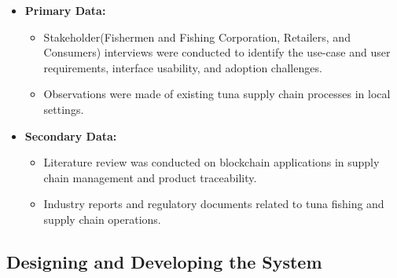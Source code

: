 \begin{itemize}
	\item \textbf{Primary Data:} 
	\begin{itemize}
		\item Stakeholder(Fishermen and Fishing Corporation, Retailers, and Consumers) interviews were conducted to identify the use-case and user requirements, interface usability, and adoption challenges.
		\item Observations were made of existing tuna supply chain processes in local settings.
	\end{itemize}
	\item \textbf{Secondary Data:} 
	\begin{itemize}
		\item Literature review was conducted on blockchain applications in supply chain management and product traceability.
		\item Industry reports and regulatory documents related to tuna fishing and supply chain operations.
	\end{itemize}
\end{itemize}

\subsection{Designing and Developing the System}

